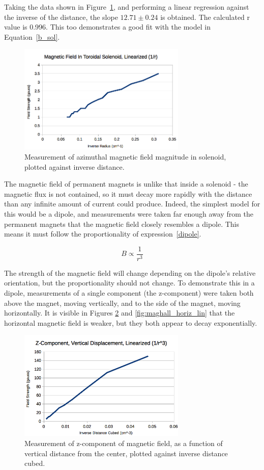 \documentclass[journal]{IEEEtran}
\begin{document}
Taking the data shown in Figure~\ref{fig:toroid_hall_lin}, and performing a linear
regression against the inverse of the distance, the slope $12.71 \pm 0.24$ is
obtained. The calculated r value is 0.996. This too demonstrates a good fit
with the model in Equation~\ref{b_sol}.


\begin{figure}[ht!]
\centering
\includegraphics[width=80mm]{toroid_hall_lin.png}
\caption{Measurement of azimuthal magnetic field magnitude in solenoid, plotted
against inverse distance.}
\label{fig:toroid_hall_lin}
\end{figure}

The magnetic field of permanent magnets is unlike that inside a solenoid - the
magnetic flux is not contained, so it must decay more rapidly with the distance
than any infinite amount of current could produce. Indeed, the simplest model
for this would be a dipole, and measurements were taken far enough away from
    the permanent magnets that the magnetic field closely resembles a dipole.
    This means it must follow the proportionality of expression~\ref{dipole}.

\begin{equation}
\label{dipole}
B \propto \frac{1}{r^3}
\end{equation}

The strength of the magnetic field will change depending on the dipole's
relative orientation, but the proportionality should not change. To demonstrate
this in a dipole, measurements of a single component (the z-component) were
taken both above the magnet, moving vertically, and to the side of the magnet,
moving horizontally. It is visible in Figures \ref{fig:maghall_vert_lin} and
\ref{fig:maghall_horiz_lin} that the horizontal magnetic field is weaker, but they
both appear to decay exponentially.
 

\begin{figure}[ht!]
\centering
\includegraphics[width=80mm]{maghall_vert_lin.png}
\caption{Measurement of z-component of magnetic field, as a function of
vertical distance from the center, plotted against inverse distance cubed.}
\label{fig:maghall_vert_lin}
\end{figure}
\end{document}
